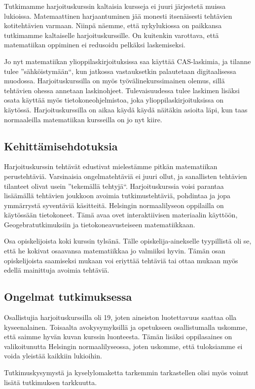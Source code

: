 Tutkimamme harjoituskurssin kaltaisia kursseja ei juuri järjestetä muissa lukioissa.
Matemaattinen harjaantuminen jää monesti itsenäisesti tehtävien kotitehtävien varmaan.
Niinpä näemme, että nykylukiossa on paikkansa tutkimamme kaltaiselle harjoituskurssille.%
On kuitenkin varottava, että matematiikan oppiminen ei redusoidu pelkäksi laskemiseksi.

Jo nyt matematiikan ylioppilaskirjoituksissa saa käyttää CAS-laskimia, ja tilanne tulee ''sähköistymään``, kun jatkossa vastauksetkin palautetaan digitaalisessa muodossa.
Harjoituskurssilla on myös työvälinekurssimainen olemus, sillä tehtävien ohessa annetaan laskinohjeet.
Tulevaisuudessa tulee laskimen lisäksi osata käyttää myös tietokoneohjelmistoa, joka ylioppilaskirjoituksissa on käytössä.
Harjoituskurssilla on aikaa käydä käydä näitäkin asioita läpi, kun taas normaaleilla matematiikan kursseilla on jo nyt kiire.

\subsection{Kehittämisehdotuksia}
Harjoituskurssin tehtävät edustivat mielestämme pitkän matematiikan perustehtäviä.
Varsinaisia ongelmatehtäviä ei juuri ollut, ja sanallisten tehtävien tilanteet olivat usein ''tekemällä tehtyjä``.
Harjoituskurssia voisi parantaa lisäämällä tehtävien joukkoon avoimia tutkimustehtäviä, pohdintaa ja jopa ymmärrystä syventäviä käsitteitä.
Helsingin normaalilyseon oppilailla on käytössään tietokoneet.
Tämä avaa ovet interaktiivisen materiaalin käyttöön, Geogebratutkimuksiin ja tietokoneavusteiseen matematiikkaan.

Osa opiskelijoista koki kurssin tylsänä.
Tälle opiskelija-ainekselle tyypillistä oli se, että he kokivat osaavansa matematiikkaa jo valmiiksi hyvin.
Tämän osan opiskelijoista saamiseksi mukaan voi eriyttää tehtäviä tai ottaa mukaan myös edellä mainittuja avoimia tehtäviä.

\subsection{Ongelmat tutkimuksessa}
Osallistujia harjoituskurssilla oli 19, joten aineiston luotettavuus saattaa olla kyseenalainen.
Toisaalta avokysymyksillä ja opetukseen osallistumalla uskomme, että saimme hyvän kuvan kurssin luonteesta.
Tämän lisäksi oppilasaines on valikoitunutta Helsingin normaalilyseossa, joten uskomme, että tuloksiamme ei voida yleistää kaikkiin lukioihin.

Tutkimuskysymystä ja kyselylomaketta tarkemmin tarkastellen olisi myös voinut lisätä tutkimuksen tarkkuutta.


